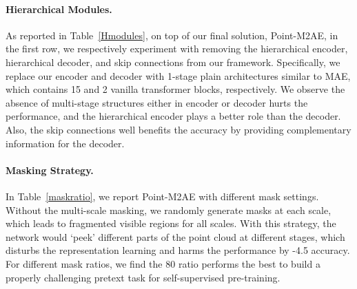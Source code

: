 \documentclass{article}
\begin{document}
\paragraph{Hierarchical Modules.}
As reported in Table~\ref{Hmodules}, on top of our final solution, Point-M2AE, in the first row, we respectively experiment with removing the hierarchical encoder, hierarchical decoder, and skip connections from our framework. Specifically, we replace our encoder and decoder with 1-stage plain architectures similar to MAE, which contains 15 and 2 vanilla transformer blocks, respectively. We observe the absence of multi-stage structures either in encoder or decoder hurts the performance, and the hierarchical encoder plays a better role than the decoder. Also, the skip connections well benefits the accuracy by providing complementary information for the decoder.

\paragraph{Masking Strategy.}
In Table~\ref{maskratio}, we report Point-M2AE with different mask settings. Without the multi-scale masking, we randomly generate masks at each scale, which leads to fragmented visible regions for all scales. With this strategy, the network would `peek' different parts of the point cloud at different stages, which disturbs the representation learning and harms the performance by -4.5 accuracy. For different mask ratios, we find the 80 ratio performs the best to build a properly challenging pretext task for self-supervised pre-training.
\end{document}
